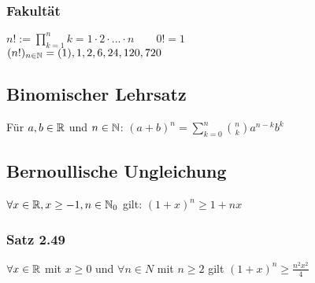 \subsubsection*{Fakultät}
$n! := \prod\limits_{k=1}^n k = 1 \cdot 2 \cdot ... \cdot n \quad\quad 0! = 1$\\
$(n!)_{n\in\mathbb N} = (1), 1, 2, 6, 24, 120, 720$
\subsection*{Binomischer Lehrsatz}
Für $a, b \in \mathbb R$ und $n \in \mathbb N$:
$(a + b)^n = \sum\limits_{k = 0}^n \binom{n}{k} a^{n - k}b^k$
\subsection*{Bernoullische Ungleichung}
$\forall x \in \mathbb R, x \geq -1, n \in \mathbb N_0$ gilt:
$(1 + x)^n \geq 1 + nx$
\subsubsection*{Satz 2.49}
$\forall x \in \mathbb R$ mit $x \geq 0$ und $\forall n \in N$ mit $n \geq 2$ gilt
$(1 + x)^n \geq \frac{n^2 x^2}{4}$